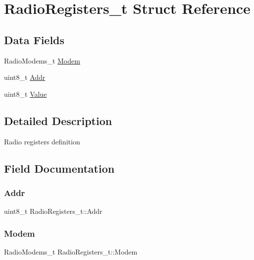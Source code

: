 \hypertarget{structRadioRegisters__t}{}\section{Radio\+Registers\+\_\+t Struct Reference}
\label{structRadioRegisters__t}
\subsection*{Data Fields}
\begin{DoxyCompactItemize}
\item 
Radio\+Modems\+\_\+t \hyperlink{structRadioRegisters__t_ac6afe776307cb73dcf68fbc676987dc9}{Modem}
\item 
uint8\+\_\+t \hyperlink{structRadioRegisters__t_ae5c37cbae4eadb59b9b1026a404d4f8f}{Addr}
\item 
uint8\+\_\+t \hyperlink{structRadioRegisters__t_a0a8957bb6a4a895509181c120af90cdf}{Value}
\end{DoxyCompactItemize}


\subsection{Detailed Description}
Radio registers definition 

\subsection{Field Documentation}
\mbox{\label{structRadioRegisters__t_ae5c37cbae4eadb59b9b1026a404d4f8f}} 
\subsubsection{\texorpdfstring{Addr}{Addr}}
{\footnotesize\ttfamily uint8\+\_\+t Radio\+Registers\+\_\+t\+::\+Addr}

\mbox{\label{structRadioRegisters__t_ac6afe776307cb73dcf68fbc676987dc9}} 
\subsubsection{\texorpdfstring{Modem}{Modem}}
{\footnotesize\ttfamily Radio\+Modems\+\_\+t Radio\+Registers\+\_\+t\+::\+Modem}

